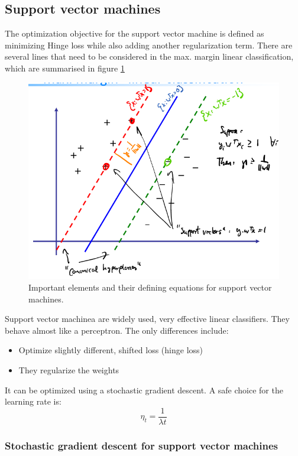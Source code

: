 \documentclass[a4paper,10pt,twoside]{article}
\begin{document}
\subsection{Support vector machines}

The optimization objective for the support vector machine is defined as minimizing Hinge loss while also adding another regularization term. There are several lines that need to be considered in the max. margin linear classification, which are summarised in figure \ref{planes_svm}

\begin{figure}
    \centering
    \includegraphics[width=.8\textwidth]{figures/max_margin_decision_boundaries.png}
    \caption{Important elements and their defining equations for support vector machines.}
    \label{planes_svm}
\end{figure}

Support vector machinea are widely used, very effective linear classifiers. They behave almost like a perceptron. The only differences include:
\begin{itemize}
    \item Optimize slightly different, shifted loss (hinge loss)
    \item They regularize the weights
\end{itemize}
It can be optimized using a stochastic gradient descent. A safe choice for the learning rate is:
\begin{equation*}
    \eta_t=\frac{1}{\lambda t}
\end{equation*}

\subsubsection{Stochastic gradient descent for support vector machines}
\end{document}
